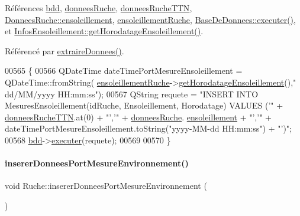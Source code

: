 Références \hyperlink{class_ruche_a8577fdedabdecd98652e338e83bb3b65}{bdd}, \hyperlink{class_ruche_a1526bfa78f03e0710ad16f880a40c15f}{donnees\+Ruche}, \hyperlink{class_ruche_a4556832042641c08a6ef2ab9d80d771e}{donnees\+Ruche\+T\+TN}, \hyperlink{struct_donnees_ruche_adfa6aee15b2a96b968e558ac14e0f2de}{Donnees\+Ruche\+::ensoleillement}, \hyperlink{class_ruche_a197003ecff4f029885c7d38569a68d49}{ensoleillement\+Ruche}, \hyperlink{class_base_de_donnees_aa8de5f8f8bb17edc43f5c0ee33712081}{Base\+De\+Donnees\+::executer()}, et \hyperlink{class_infos_ensoleillement_a0bd39540c8b4a242ea378c91bbc58b89}{Infos\+Ensoleillement\+::get\+Horodatage\+Ensoleillement()}.



Référencé par \hyperlink{class_ruche_a21c0dafeaec03d451590037343e6a3ca}{extraire\+Donnees()}.


\begin{DoxyCode}
00565 \{
00566     QDateTime dateTimePortMesureEnsoleillement = QDateTime::fromString(
      \hyperlink{class_ruche_a197003ecff4f029885c7d38569a68d49}{ensoleillementRuche}->\hyperlink{class_infos_ensoleillement_a0bd39540c8b4a242ea378c91bbc58b89}{getHorodatageEnsoleillement}(),\textcolor{stringliteral}{"
      dd/MM/yyyy HH:mm:ss"});
00567     QString requete = \textcolor{stringliteral}{"INSERT INTO MesuresEnsoleillement(idRuche, Ensoleillement, Horodatage) VALUES ('"} + 
      \hyperlink{class_ruche_a4556832042641c08a6ef2ab9d80d771e}{donneesRucheTTN}.at(0) + \textcolor{stringliteral}{"','"}  + \hyperlink{class_ruche_a1526bfa78f03e0710ad16f880a40c15f}{donneesRuche}.
      \hyperlink{struct_donnees_ruche_adfa6aee15b2a96b968e558ac14e0f2de}{ensoleillement} + \textcolor{stringliteral}{"','"} + dateTimePortMesureEnsoleillement.toString(\textcolor{stringliteral}{"yyyy-MM-dd  HH:mm:ss"}) + \textcolor{stringliteral}{
      "')"};
00568     \hyperlink{class_ruche_a8577fdedabdecd98652e338e83bb3b65}{bdd}->\hyperlink{class_base_de_donnees_aa8de5f8f8bb17edc43f5c0ee33712081}{executer}(requete);
00569 
00570 \}
\end{DoxyCode}
\mbox{\label{class_ruche_a46c0f440f40a5125f2d579b481660457}} 
\paragraph{\texorpdfstring{inserer\+Donnees\+Port\+Mesure\+Environnement()}{insererDonneesPortMesureEnvironnement()}}
{\footnotesize\ttfamily void Ruche\+::inserer\+Donnees\+Port\+Mesure\+Environnement (\begin{DoxyParamCaption}{ }\end{DoxyParamCaption})\hspace{0.3cm}{\ttfamily [private]}}



